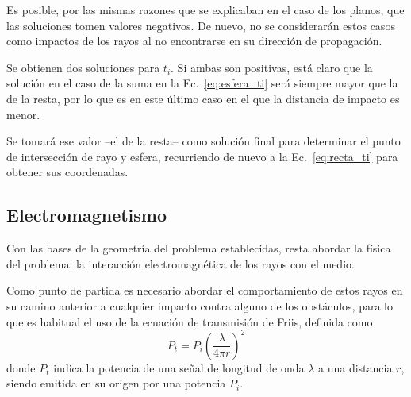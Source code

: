 Es posible, por las mismas razones que se explicaban en el caso de los planos, que las soluciones tomen valores negativos.
De nuevo, no se considerarán estos casos como impactos de los rayos al no encontrarse en su dirección de propagación.

Se obtienen dos soluciones para $t_i$.
Si ambas son positivas, está claro que la solución en el caso de la suma en la Ec.~\eqref{eq:esfera_ti} será siempre mayor que la de la resta, por lo que es en este último caso en el que la distancia de impacto es menor.

Se tomará ese valor --el de la resta-- como solución final para determinar el punto de intersección de rayo y esfera, recurriendo de nuevo a la Ec.~\eqref{eq:recta_ti} para obtener sus coordenadas.




\subsection{Electromagnetismo}

Con las bases de la geometría del problema establecidas, resta abordar la física del problema: la interacción electromagnética de los rayos con el medio.

Como punto de partida es necesario abordar el comportamiento de estos rayos en su camino anterior a cualquier impacto contra alguno de los obstáculos, para lo que es habitual el uso de la ecuación de transmisión de Friis, definida como\cite{Antennas}
\begin{equation}
    \label{eq:Friis}
    P_t = P_i \left( \frac{\lambda}{4\pi r} \right)^2
\end{equation}
donde $P_t$ indica la potencia de una señal de longitud de onda $\lambda$ a una distancia $r$, siendo emitida en su origen por una potencia $P_i$.

